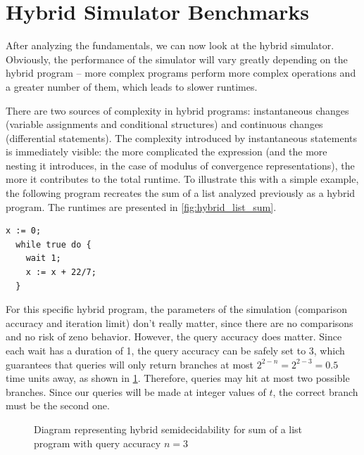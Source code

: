 
\pagebreak

\section{Hybrid Simulator Benchmarks}
\label{sec:simulator_benches}

After analyzing the fundamentals, we can now look at the hybrid simulator. Obviously, the performance of the simulator will vary greatly depending on the hybrid program -- more complex programs perform more complex operations and a greater number of them, which leads to slower runtimes.

There are two sources of complexity in hybrid programs: instantaneous changes (variable assignments and conditional structures) and continuous changes (differential statements). The complexity introduced by instantaneous statements is immediately visible: the more complicated the expression (and the more nesting it introduces, in the case of modulus of convergence representations), the more it contributes to the total runtime. To illustrate this with a simple example, the following program recreates the sum of a list analyzed previously as a hybrid program. The runtimes are presented in \cref{fig:hybrid_list_sum}.

\begin{lstlisting}[caption=Hybrid program that at time $t$ calculates the sum of $\lfloor t \rfloor + 1$ elements]
  x := 0;
  while true do {
    wait 1;
    x := x + 22/7;
  }
\end{lstlisting}

For this specific hybrid program, the parameters of the simulation (comparison accuracy and iteration limit) don't really matter, since there are no comparisons and no risk of zeno behavior. However, the query accuracy does matter. Since each wait has a duration of 1, the query accuracy can be safely set to 3, which guarantees that queries will only return branches at most $2^{2-n}=2^{2-3}=0.5$ time units away, as shown in \cref{fig:hybrid_branches_list_sum}. Therefore, queries may hit at most two possible branches. Since our queries will be made at integer values of $t$, the correct branch must be the second one.

\begin{figure}[p]
  \centering
  
  \caption{Diagram representing hybrid semidecidability for sum of a list program with query accuracy $n=3$}
  \label{fig:hybrid_branches_list_sum}
\end{figure}

